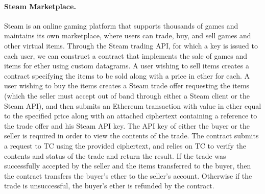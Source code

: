 
\iffalse
\paragraph{Steam Marketplace.} Steam  is an online gaming platform that supports thousands of games and maintains its own marketplace, where users can trade, buy, and sell games and other virtual items.  Through the Steam trading API, for which a key is issued to each user, we can construct a contract that implements the sale of games and items for ether using custom datagrams.  A user wishing to sell items creates a contract specifying the items to be sold along with a price in ether for each.  A user wishing to buy the items creates a Steam trade offer requesting the items (which the seller must accept out of band through either a Steam client or the Steam API), and then submits an Ethereum transaction with value in ether equal to the specified price along with an attached ciphertext containing a reference to the trade offer and his Steam API key.  The API key of either the buyer or the seller is required in order to view the contents of the trade.  The contract submits a request to TC using the provided ciphertext, and relies on TC to verify the contents and status of the trade and return the result.  If the trade was successfully accepted by the seller and the items transferred to the buyer, then the contract transfers the buyer's ether to the seller's account.  Otherwise if the trade is unsuccessful, the buyer's ether is refunded by the contract.

